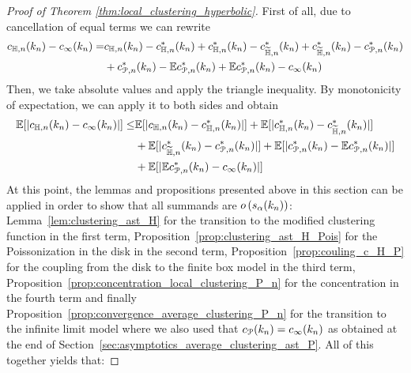 \begin{proof}[Proof of Theorem \ref{thm:local_clustering_hyperbolic}]
First of all, due to cancellation of equal terms we can rewrite
\begin{align*}
    c_{\mathbb{H},n}(k_n)-c_\infty(k_n) =& c_{\mathbb{H},n}(k_n)-c_{\mathbb{H},n}^\ast(k_n)+c_{\mathbb{H},n}^\ast(k_n)-c_{\widetilde{\mathbb{H}},n}^\ast(k_n)+c_{\widetilde{\mathbb{H}},n}^\ast(k_n)-c_{{\mathcal P},n}^\ast(k_n) \\
    &+c_{{\mathcal P},n}^\ast(k_n)-\mathbb{E} c_{{\mathcal P},n}^\ast(k_n)+\mathbb{E} c_{{\mathcal P},n}^\ast(k_n)-c_\infty(k_n)
\end{align*}
Then, we take absolute values and apply the triangle inequality. By monotonicity of expectation, we can apply it to both sides and obtain
\begin{align*}
    \mathbb{E}[|c_{\mathbb{H},n}(k_n)-c_\infty(k_n)|] \leq & \mathbb{E}[|c_{\mathbb{H},n}(k_n)-c_{\mathbb{H},n}^\ast(k_n)|]+\mathbb{E}[|c_{\mathbb{H},n}^\ast(k_n)-c_{\widetilde{\mathbb{H}},n}^\ast(k_n)|]\\&+\mathbb{E}[|c_{\widetilde{\mathbb{H}},n}^\ast(k_n)-c_{{\mathcal P},n}^\ast(k_n)|] 
    +\mathbb{E}[|c_{{\mathcal P},n}^\ast(k_n)-\mathbb{E} c_{{\mathcal P},n}^\ast(k_n)|]\\&+\mathbb{E}[|\mathbb{E} c_{{\mathcal P},n}^\ast(k_n)-c_\infty(k_n)|]
\end{align*}
At this point, the lemmas and propositions presented above in this section can be applied in order to show that all summands are $o\left(s_\alpha(k_n)\right)$: Lemma~\ref{lem:clustering_ast_H} for the transition to the modified clustering function in the first term, Proposition~\ref{prop:clustering_ast_H_Pois} for the Poissonization in the disk in the second term, Proposition~\ref{prop:couling_c_H_P} for the coupling from the disk to the finite box model in the third term, Proposition~\ref{prop:concentration_local_clustering_P_n} for the concentration in the fourth term and finally Proposition~\ref{prop:convergence_average_clustering_P_n} for the transition to the infinite limit model where we also used that $c_{{\mathcal P}}(k_n) = c_\infty(k_n)$ as obtained at the end of Section~\ref{sec:asymptotics_average_clustering_ast_P}. All of this together yields that:

\end{proof}
